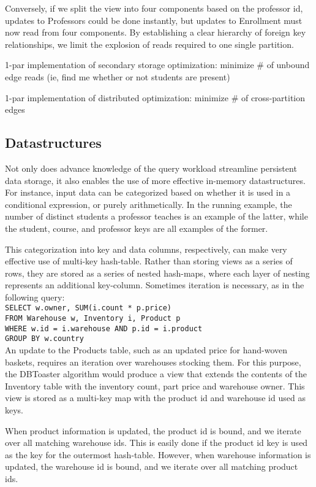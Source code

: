 Conversely, if we split the view into four components based on the professor id, updates to Professors could be done instantly, but updates to Enrollment must now read from four components.  By establishing a clear hierarchy of foreign key relationships, we limit the explosion of reads required to one single partition.

1-par implementation of secondary storage optimization: minimize \# of unbound
edge reads (ie, find me whether or not students are present)

1-par implementation of distributed optimization: minimize \# of cross-partition
edges

\subsection{Datastructures}
Not only does advance knowledge of the query workload streamline persistent data storage, it also enables the use of more effective in-memory datastructures.  For instance, input data can be categorized based on whether it is used in a conditional expression, or purely arithmetically.  In the running example, the number of distinct students a professor teaches is an example of the latter, while the student, course, and professor keys are all examples of the former.

This categorization into key and data columns, respectively, can make very effective use of multi-key hash-table.  Rather than storing views as a series of rows, they are stored as a series of nested hash-maps, where each layer of nesting represents an additional key-column.  Sometimes iteration is necessary, as in the following query:\texttt{\\
SELECT w.owner, SUM(i.count * p.price)\\
FROM Warehouse w, Inventory i, Product p\\
WHERE w.id = i.warehouse AND p.id = i.product\\
GROUP BY w.country\\
}
An update to the Products table, such as an updated price for hand-woven baskets, requires an iteration over warehouses stocking them.  For this purpose, the DBToaster algorithm would produce a view that extends the contents of the Inventory table with the inventory count, part price and warehouse owner.  This view is stored as a multi-key map with the product id and warehouse id used as keys.

When product information is updated, the product id is bound, and we iterate over all matching warehouse ids.  This is easily done if the product id key is used as the key for the outermost hash-table.  However, when warehouse information is updated, the warehouse id is bound, and we iterate over all matching product ids.  

